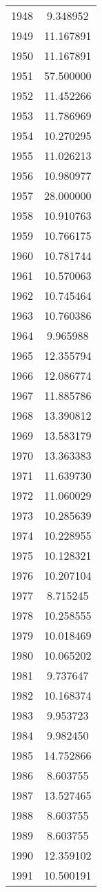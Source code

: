 \documentclass[12pt]{article}
\begin{document}
\begin{longtable}{@{}cc@{}}
1948 & 9.348952 \\
1949 & 11.167891 \\
1950 & 11.167891 \\
1951 & 57.500000 \\
1952 & 11.452266 \\
1953 & 11.786969 \\
1954 & 10.270295 \\
1955 & 11.026213 \\
1956 & 10.980977 \\
1957 & 28.000000 \\
1958 & 10.910763 \\
1959 & 10.766175 \\
1960 & 10.781744 \\
1961 & 10.570063 \\
1962 & 10.745464 \\
1963 & 10.760386 \\
1964 & 9.965988 \\
1965 & 12.355794 \\
1966 & 12.086774 \\
1967 & 11.885786 \\
1968 & 13.390812 \\
1969 & 13.583179 \\
1970 & 13.363383 \\
1971 & 11.639730 \\
1972 & 11.060029 \\
1973 & 10.285639 \\
1974 & 10.228955 \\
1975 & 10.128321 \\
1976 & 10.207104 \\
1977 & 8.715245 \\
1978 & 10.258555 \\
1979 & 10.018469 \\
1980 & 10.065202 \\
1981 & 9.737647 \\
1982 & 10.168374 \\
1983 & 9.953723 \\
1984 & 9.982450 \\
1985 & 14.752866 \\
1986 & 8.603755 \\
1987 & 13.527465 \\
1988 & 8.603755 \\
1989 & 8.603755 \\
1990 & 12.359102 \\
1991 & 10.500191 \\

\end{longtable}
\end{document}
